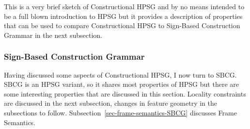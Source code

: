 \documentclass[output=paper]{langsci/langscibook}
\begin{document}
This is a very brief sketch of Constructional HPSG and by no means intended to be a full blown
introduction to HPSG but it provides a description of properties that can be used to compare
Constructional HPSG to Sign-Based Construction Grammar in the next subsection.




\subsubsection{Sign-Based Construction Grammar}
\label{sec-sbcg}

Having discussed some aspects of Constructional HPSG, I now turn to SBCG. SBCG is an HPSG variant,
so it shares most properties of HPSG but there are some interesting properties that are discussed in
this section. Locality constraints are discussed in the next subsection, changes in feature geometry
in the subsections to follow. Subsection~\ref{sec-frame-semantics-SBCG} discusses Frame Semantics.

\label{sec-locality}
\end{document}
